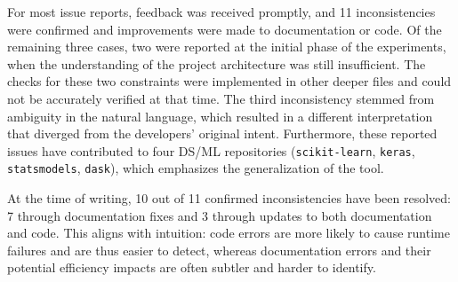 For most issue reports, feedback was received promptly, and 11 inconsistencies were confirmed and improvements were made to documentation or code. Of the remaining three cases, two were reported at the initial phase of the experiments, when the understanding of the project architecture was still insufficient. The checks for these two constraints were implemented in other deeper files and could not be accurately verified at that time. The third inconsistency stemmed from ambiguity in the natural language, which resulted in a different interpretation that diverged from the developers' original intent. Furthermore, these reported issues have contributed to four DS/ML repositories (\texttt{scikit-learn}, \texttt{keras}, \texttt{statsmodels}, \texttt{dask}), which emphasizes the generalization of the tool.

At the time of writing, 10 out of 11 confirmed inconsistencies have been resolved: 7 through documentation fixes and 3 through updates to both documentation and code. This aligns with intuition: code errors are more likely to cause runtime failures and are thus easier to detect, whereas documentation errors and their potential efficiency impacts are often subtler and harder to identify.


